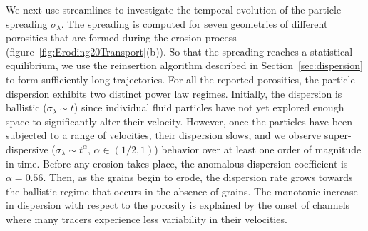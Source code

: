 \documentclass{jfm}
\begin{document}
We next use streamlines to investigate the temporal evolution of the
particle spreading $\sigma_\lambda$.  The spreading is computed for
seven geometries of different porosities that are formed during the
erosion process (figure~\ref{fig:Eroding20Transport}(b)).  So that the
spreading reaches a statistical equilibrium, we use the reinsertion
algorithm described in Section~\ref{sec:dispersion} to form sufficiently
long trajectories.  For all the reported porosities, the particle
dispersion exhibits two distinct power law regimes.  Initially, the
dispersion is ballistic ($\sigma_\lambda \sim t$) since individual fluid
particles have not yet explored enough space to significantly alter
their velocity.  However, once the particles have been subjected to a
range of velocities, their dispersion slows, and we observe
super-dispersive ($\sigma_\lambda \sim t^\alpha$, $\alpha \in (1/2,1)$)
behavior over at least one order of magnitude in time.  Before any
erosion takes place, the anomalous dispersion coefficient is $\alpha =
0.56$.  Then, as the grains begin to erode, the dispersion rate grows
towards the ballistic regime that occurs in the absence of grains.  The
monotonic increase in dispersion with respect to the porosity is
explained by the onset of channels where many tracers experience less
variability in their velocities.
\end{document}
